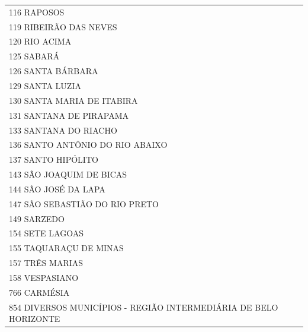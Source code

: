 \documentclass{article}
\begin{document}
\begin{longtable}[c]{m{18cm}}
\multicolumn{1}{l}{ \hspace{2em} 116 RAPOSOS } \\
\multicolumn{1}{l}{ \hspace{2em} 119 RIBEIRÃO DAS NEVES } \\
\multicolumn{1}{l}{ \hspace{2em} 120 RIO ACIMA } \\
\multicolumn{1}{l}{ \hspace{2em} 125 SABARÁ } \\
\multicolumn{1}{l}{ \hspace{2em} 126 SANTA BÁRBARA } \\
\multicolumn{1}{l}{ \hspace{2em} 129 SANTA LUZIA } \\
\multicolumn{1}{l}{ \hspace{2em} 130 SANTA MARIA DE ITABIRA } \\
\multicolumn{1}{l}{ \hspace{2em} 131 SANTANA DE PIRAPAMA } \\
\multicolumn{1}{l}{ \hspace{2em} 133 SANTANA DO RIACHO } \\
\multicolumn{1}{l}{ \hspace{2em} 136 SANTO ANTÔNIO DO RIO ABAIXO } \\
\multicolumn{1}{l}{ \hspace{2em} 137 SANTO HIPÓLITO } \\
\multicolumn{1}{l}{ \hspace{2em} 143 SÃO JOAQUIM DE BICAS } \\
\multicolumn{1}{l}{ \hspace{2em} 144 SÃO JOSÉ DA LAPA } \\
\multicolumn{1}{l}{ \hspace{2em} 147 SÃO SEBASTIÃO DO RIO PRETO } \\
\multicolumn{1}{l}{ \hspace{2em} 149 SARZEDO } \\
\multicolumn{1}{l}{ \hspace{2em} 154 SETE LAGOAS } \\
\multicolumn{1}{l}{ \hspace{2em} 155 TAQUARAÇU DE MINAS } \\
\multicolumn{1}{l}{ \hspace{2em} 157 TRÊS MARIAS } \\
\multicolumn{1}{l}{ \hspace{2em} 158 VESPASIANO } \\
\multicolumn{1}{l}{ \hspace{2em} 766 CARMÉSIA } \\
\multicolumn{1}{l}{ \hspace{2em} 854 DIVERSOS MUNICÍPIOS - REGIÃO INTERMEDIÁRIA DE BELO HORIZONTE } \\
\end{longtable}
\end{document}
